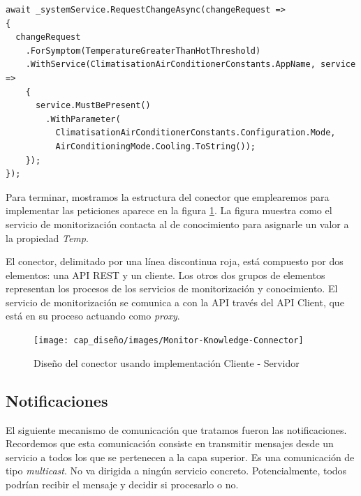 \begin{lstlisting}[language={[Sharp]C},caption={Implementación de la misma petición siguiendo el patrón \emph{builder}.},captionpos=b, label=ls:analysis-api-cliente-request-builder]
await _systemService.RequestChangeAsync(changeRequest =>
{
  changeRequest
    .ForSymptom(TemperatureGreaterThanHotThreshold)
    .WithService(ClimatisationAirConditionerConstants.AppName, service =>
    {
      service.MustBePresent()
        .WithParameter(
          ClimatisationAirConditionerConstants.Configuration.Mode,
          AirConditioningMode.Cooling.ToString());
    });
});
\end{lstlisting}

Para terminar, mostramos la estructura del conector que emplearemos para implementar las peticiones aparece en la figura \ref{fig:monitor-knowledge-connector-architecture}. La figura muestra como el servicio de monitorización contacta al de conocimiento para asignarle un valor a la propiedad \emph{Temp}.

El conector, delimitado por una línea discontinua roja, está compuesto por dos elementos: una API REST y un cliente. Los otros dos grupos de elementos representan los procesos de los servicios de monitorización y conocimiento. El servicio de monitorización se comunica a con la API través del API Client, que está en su proceso actuando como \emph{proxy}.

\begin{figure}[htb]
  \centering
  \texttt{[image: cap\_diseño/images/Monitor-Knowledge-Connector]}
  \caption{Diseño del conector usando implementación Cliente - Servidor}
  \label{fig:monitor-knowledge-connector-architecture}
\end{figure}

\subsection{Notificaciones}

El siguiente mecanismo de comunicación que tratamos fueron las notificaciones. Recordemos que esta comunicación consiste en transmitir mensajes desde un servicio a todos los que se pertenecen a la capa superior. Es una comunicación de tipo \emph{multicast}. No va dirigida a ningún servicio concreto. Potencialmente, todos podrían recibir el mensaje y decidir si procesarlo o no.

